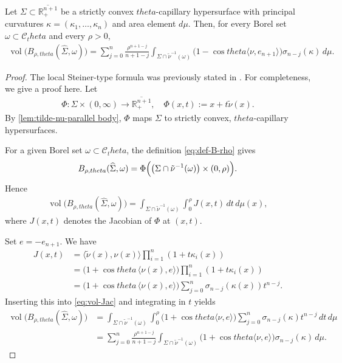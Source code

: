 \documentclass[12pt]{amsart}
\def\theta{theta}%
\numberwithin{equation}{section}
\newcommand{\wh}{\widehat}
\newcommand{\sub}{\subset}
\newcommand{\ov}{\overline}
\newcommand{\bbR}{\mathbb{R}}
\newcommand{\8}{\infty}
\newcommand{\si}{\sigma}
\newcommand{\Si}{\Sigma}
\newcommand{\cC}{\mathcal{C}}
\DeclareMathOperator{\vol}{vol}
\newcommand{\ip}[2]{\langle #1,#2 \rangle}
\newcommand{\eq}[1]{\begin{equation}\begin{alignedat}{2}#1\end{alignedat}\end{equation}}
\newcommand{\Rplus}{\bbR^{n+1}_+}
\newcommand{\Cth}{\cC_\theta}
\begin{document}
\begin{lemma}\label{lem:local-Steiner}
Let $\Si\sub\ov{\Rplus}$ be a strictly convex $\theta$-capillary
hypersurface with principal curvatures
$\kappa=(\kappa_1,\dots,\kappa_n)$ and area element $d\mu$. Then, for every
Borel set $\omega\sub\Cth$ and every $\rho>0$,
\eq{\label{eq:local-Steiner-geom}
\vol\bigl(B_{\rho,\theta}(\wh\Si,\omega)\bigr)
=\sum_{j=0}^n \frac{\rho^{n+1-j}}{n+1-j}
\int_{\Si\cap\tilde{\nu}^{-1}(\omega)}
  \bigl(1-\cos\theta\ip{\nu}{e_{n+1}}\bigr)\si_{n-j}(\kappa)\,d\mu.
}
\end{lemma}
\begin{proof}
The local Steiner-type formula was previously stated in \cite{MWW25c}. For completeness, we give a proof here.
Let
\eq{
  \Phi:\Si\times(0,\infty)\to\ov{\Rplus},\quad
  \Phi(x,t):=x+t\tilde{\nu}(x).
}
By \autoref{lem:tilde-nu-parallel body}, $\Phi$ maps $\Si$ to  strictly convex, $\theta$-capillary hypersurfaces.

For a given Borel set $\omega\sub\Cth$, the definition
\eqref{eq:def-B-rho} gives
\eq{
  B_{\rho,\theta}(\wh\Si,\omega)
  = \Phi\Bigl(
        \bigl(\Si\cap\tilde{\nu}^{-1}(\omega)\bigr)\times(0,\rho)
     \Bigr).
}
Hence
\eq{\label{eq:vol-Jac}
\vol\bigl(B_{\rho,\theta}(\wh\Si,\omega)\bigr)
  = \int_{\Si\cap\tilde{\nu}^{-1}(\omega)}
      \int_0^\rho J(x,t)\,dt\,d\mu(x),
}
where $J(x,t)$ denotes the Jacobian of $\Phi$ at $(x,t)$.

Set $e=-e_{n+1}$. We have
\eq{
  J(x,t)
  &= \ip{\tilde{\nu}(x)}{\nu(x)}
    \prod_{i=1}^n (1+t\kappa_i(x)) \\
  &= \bigl(1+\cos\theta\,\ip{\nu(x)}{e}\bigr)
    \prod_{i=1}^n (1+t\kappa_i(x)) \\
  &= \bigl(1+\cos\theta\,\ip{\nu(x)}{e}\bigr)
    \sum_{j=0}^n \si_{n-j}(\kappa(x))t^{n-j}.
}
Inserting this into \eqref{eq:vol-Jac} and integrating in $t$ yields
\eq{
\vol\bigl(B_{\rho,\theta}(\wh\Si,\omega)\bigr)
&= \int_{\Si\cap\tilde{\nu}^{-1}(\omega)}
      \int_0^\rho
        \bigl(1+\cos\theta\ip{\nu}{e}\bigr)
        \sum_{j=0}^n \si_{n-j}(\kappa)t^{n-j}
      \,dt\,d\mu\\
&= \sum_{j=0}^n
     \frac{\rho^{n+1-j}}{n+1-j}
     \int_{\Si\cap\tilde{\nu}^{-1}(\omega)}
       \bigl(1+\cos\theta\ip{\nu}{e}\bigr)
       \si_{n-j}(\kappa)\,d\mu.
}
\end{proof}
\end{document}
